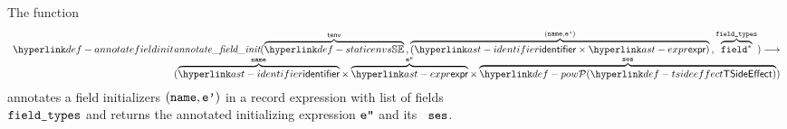 \FormallyParagraph
\begin{mathpar}
\end{mathpar}

\hypertarget{def-annotatefieldinit}{}
The function
\[
\begin{array}{r}
  \annotatefieldinit(
    \overname{\staticenvs}{\tenv} \aslsep
    \overname{(\identifier\times\expr)}{(\name, \vep)} \aslsep
    \overname{\field^*}{\fieldtypes}
  ) \aslto \\
  (\overname{\identifier}{\name} \times \overname{\expr}{\vepp} \times \overname{\TSideEffectSet}{\vses})
\end{array}
\]
annotates a field initializers $(\name, \vep)$ in a record expression
with list of fields \\ $\fieldtypes$ and returns the annotated initializing expression $\vepp$
and its \sideeffectdescriptorterm\ $\vses$. \ProseOtherwiseTypeError

